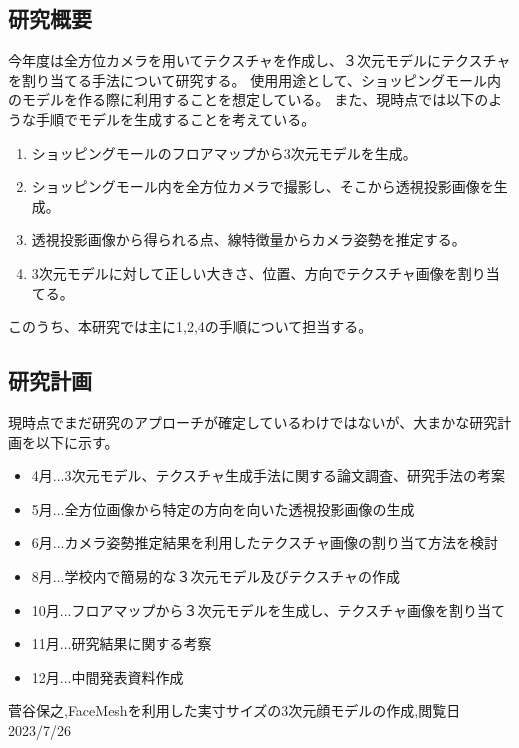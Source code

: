 \documentclass[]{jarticle}          %
\begin{document}
\subsection{研究概要}
今年度は全方位カメラを用いてテクスチャを作成し、３次元モデルにテクスチャを割り当てる手法について研究する。
使用用途として、ショッピングモール内のモデルを作る際に利用することを想定している。
また、現時点では以下のような手順でモデルを生成することを考えている。
\begin{enumerate}
  \item ショッピングモールのフロアマップから3次元モデルを生成。
  \item ショッピングモール内を全方位カメラで撮影し、そこから透視投影画像を生成。
  \item 透視投影画像から得られる点、線特徴量からカメラ姿勢を推定する。
  \item 3次元モデルに対して正しい大きさ、位置、方向でテクスチャ画像を割り当てる。
\end{enumerate}
このうち、本研究では主に1,2,4の手順について担当する。

\subsection{研究計画}
現時点でまだ研究のアプローチが確定しているわけではないが、大まかな研究計画を以下に示す。
\begin{itemize}
  \item 4月...3次元モデル、テクスチャ生成手法に関する論文調査、研究手法の考案
  \item 5月...全方位画像から特定の方向を向いた透視投影画像の生成
  \item 6月...カメラ姿勢推定結果を利用したテクスチャ画像の割り当て方法を検討
  \item 8月...学校内で簡易的な３次元モデル及びテクスチャの作成
  \item 10月...フロアマップから３次元モデルを生成し、テクスチャ画像を割り当て
  \item 11月...研究結果に関する考察
  \item 12月...中間発表資料作成
\end{itemize}
\begin{thebibliography}{99}
 菅谷保之,FaceMeshを利用した実寸サイズの3次元顔モデルの作成,閲覧日2023/7/26
\end{thebibliography}
\end{document}
